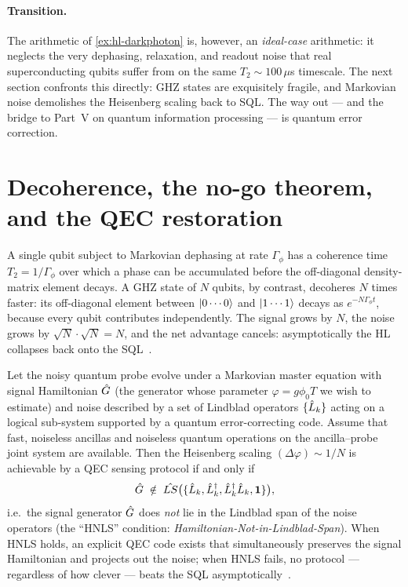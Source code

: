 \paragraph{Transition.}
The arithmetic of \cref{ex:hl-darkphoton} is, however, an
\emph{ideal-case} arithmetic: it neglects the very dephasing,
relaxation, and readout noise that real superconducting qubits
suffer from on the same $T_2\sim 100\,\mu$s timescale. The next
section confronts this directly: GHZ states are exquisitely
fragile, and Markovian noise demolishes the Heisenberg scaling
back to SQL. The way out --- and the bridge to Part~V on quantum
information processing --- is quantum error correction.

\section{Decoherence, the no-go theorem, and the QEC restoration}
\label{sec:qec-metrology}

\begin{phenomenon}
A single qubit subject to Markovian dephasing at rate
$\Gamma_\phi$ has a coherence time $T_2=1/\Gamma_\phi$ over
which a phase can be accumulated before the off-diagonal
density-matrix element decays. A GHZ state of $N$ qubits, by
contrast, decoheres $N$ times faster: its off-diagonal element
between $\ket{0\cdots 0}$ and $\ket{1\cdots 1}$ decays as
$e^{-N\Gamma_\phi t}$, because every qubit contributes
independently. The signal grows by $N$, the noise grows by
$\sqrt{N}\cdot\sqrt{N}=N$, and the net advantage cancels:
asymptotically the HL collapses back onto the
SQL~\cite{huelga1997,escher2011,demkowicz2012}.
\end{phenomenon}

\begin{statement}
\label{stmt:hnls}
Let the noisy quantum probe evolve under a Markovian master
equation with signal Hamiltonian $\hat{G}$ (the generator whose
parameter $\varphi=g\phi_0 T$ we wish to estimate) and noise
described by a set of Lindblad operators $\{\hat{L}_k\}$ acting
on a logical sub-system supported by a quantum
error-correcting code. Assume that fast,
noiseless ancillas and noiseless quantum operations on the
ancilla--probe joint system are available. Then the Heisenberg
scaling $(\Delta\varphi)\sim 1/N$ is achievable by a QEC sensing
protocol if and only if
\begin{equation}
\label{eq:hnls}
\hat{G} \;\notin\; \hat{LS}\bigl(\{\hat{L}_k,\hat{L}_k^\dagger,
\hat{L}_k^\dagger\hat{L}_k,\mathbf{1}\}\bigr),
\end{equation}
i.e.\ the signal generator $\hat{G}$ does \emph{not} lie in
the Lindblad span of the noise operators (the ``HNLS''
condition: \emph{Hamiltonian-Not-in-Lindblad-Span}). When
HNLS holds, an explicit QEC code exists that simultaneously
preserves the signal Hamiltonian and projects out the noise;
when HNLS fails, no protocol --- regardless of how clever ---
beats the SQL asymptotically~\cite{zhou2018}.
\end{statement}

